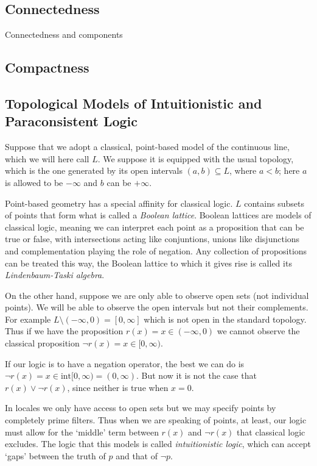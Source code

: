 \documentclass[oneside,english]{amsbook}
\numberwithin{section}{chapter}
\theoremstyle{plain}
\theoremstyle{definition}
\begin{document}
\subsection{Connectedness}

Connectedness and components


\subsection{Compactness}


\subsection{Topological Models of Intuitionistic and Paraconsistent Logic}

Suppose that we adopt a classical, point-based model of the continuous line, which we will here call $L$. We suppose it is equipped with the usual topology, which is the one generated by its open intervals $(a, b)\subseteq L$, where $a < b$; here $a$ is allowed to be $-\infty$ and $b$ can be $+\infty$. 

Point-based geometry has a special affinity for classical logic. $L$ contains subsets of points that form what is called a \emph{Boolean lattice}. Boolean lattices are models of classical logic, meaning we can interpret each point as a proposition that can be true or false, with intersections acting like conjuntions, unions like disjunctions and complementation playing the role of negation. Any collection of propositions can be treated this way, the Boolean lattice to which it gives rise is called its \emph{Lindenbaum-Taski algebra}.

On the other hand, suppose we are only able to observe open sets (not individual points). We will be able to observe the open intervals but not their complements. For example $L\setminus(-\infty, 0) = [0, \infty]$ which is not open in the standard topology. Thus if we have the proposition $r(x) = x\in (-\infty, 0)$ we cannot observe the classical proposition $\lnot r(x) = x\in [0, \infty)$. 

If our logic is to have a negation operator, the best we can do is $\lnot r(x) = x\in \text{int}[0, \infty) = (0, \infty)$. But now it is not the case that $r(x)\lor\lnot r(x)$, since neither is true when $x = 0$.

In locales we only have access to open sets but we may specify points by completely prime filters. Thus when we are speaking of points, at least, our logic must allow for the `middle' term between $r(x)$ and $\lnot r(x)$ that classical logic excludes. The logic that this models is called \emph{intuitionistic logic}, which can accept `gaps' between the truth of $p$ and that of $\lnot p$. 
\end{document}
